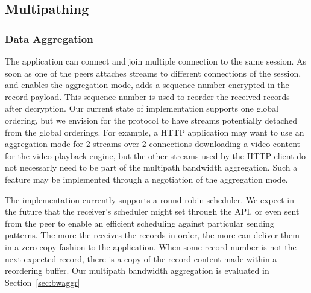 


\subsection{Multipathing}

\subsubsection{Data Aggregation}
The application can connect and join multiple \tcp connection to
the same \tcpls session. As soon as one of the peers attaches streams to
different \tcp connections of the session, and enables the aggregation mode,
\tcpls adds a sequence number encrypted in the \tls record payload. This
sequence number is used to reorder the received records after decryption. Our
current state of implementation supports one global ordering, but
we envision for the \tcpls protocol to have streams potentially detached from
the global orderings. For example, a HTTP application may want to use an
aggregation mode for 2 streams over 2 \tcp connections downloading a video
content for the video playback engine, but the other streams used by the HTTP
client do not necessarly need to be part of the multipath bandwidth aggregation.
Such a feature may be implemented through a negotiation of the aggregation
mode.

The implementation currently supports a round-robin scheduler. We expect in the
future that the receiver's scheduler might set through the API, or even sent
from the peer to enable an efficient scheduling against particular sending patterns. The more
the \tcpls receives the records in order, the more \tcpls can deliver them in a zero-copy
fashion to the application. When some record number is not the next expected
record, there is a copy of the record content made within a reordering buffer.
Our multipath bandwidth aggregation is evaluated in Section~\ref{sec:bwaggr}

